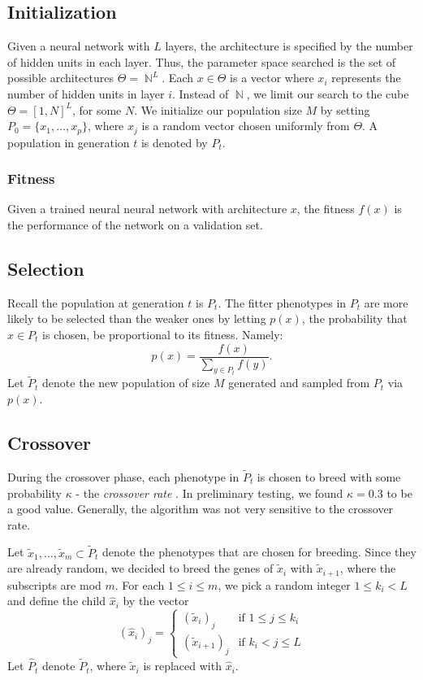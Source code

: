 \documentclass{article}
\DeclareMathOperator{\N}{\mathbb{N}}
\DeclareMathOperator{\1}{\mathbbm{1}}
\begin{document}
\subsection{Initialization} 
Given a neural network with $L$ layers, the architecture is specified by the number of hidden units in each layer. 
Thus, the parameter space searched is the set of possible architectures $\Theta=\N^L$. 
Each $x\in\Theta$ is a vector where $x_i$ represents the number of hidden units in layer $i$. 
Instead of $\N$, we limit our search to the cube $\Theta=[1,N]^L$, for some $N$.
We initialize our population size $M$ by setting $P_0=\{x_1,\dots,x_p\}$, where $x_j$ is a random vector chosen 
uniformly from $\Theta$. A population in generation $t$ is denoted by $P_t$.

\subsubsection{Fitness}
Given a trained neural neural network with architecture $x$, the fitness $f(x)$ is the performance of the network on a validation set. 


\subsection{Selection}
Recall the population at generation $t$ is $P_t$. The fitter phenotypes in $P_t$ are more
likely to be selected than the weaker ones by letting $p(x)$, the probability that $x\in P_t$ is chosen,
be proportional to its fitness. Namely:
\[p(x)=\frac{f(x)}{\sum_{y\in P_t}f(y)}.\]
Let $\tilde{P}_t$ denote the new population of size $M$ generated and sampled from $P_t$ via $p(x)$.

\subsection{Crossover}
During the crossover phase, each phenotype in $\tilde{P}_t$ is chosen to breed with some probability $\kappa$ -
the \emph{crossover rate} . In preliminary testing, we found $\kappa=0.3$ to be a good value. Generally, the 
algorithm was not very sensitive to the crossover rate.

Let ${\tilde{x}_1,\dots,\tilde{x}_m}\subset \tilde{P}_t$ denote the phenotypes that are chosen for breeding.
Since they are already random, we decided to breed the genes of $\tilde{x}_i$ with $\tilde{x}_{i+1}$, where the subscripts are mod $m$.
For each $1\leq i\leq m$, we pick a random integer $1\leq k_i< L$ and define the child $\hat{x}_i$ by the vector
\[(\hat{x}_i )_j= \begin{cases} (\tilde{x}_i)_j &\mbox{if } 1\leq j\leq k_i \\ 
(\tilde{x}_{i+1})_j & \mbox{if } k_i<j\leq L \end{cases} \]
Let $\hat{P}_t$ denote $\tilde{P}_t$, where $\tilde{x}_i$ is replaced with $\hat{x}_i$.
\end{document}
